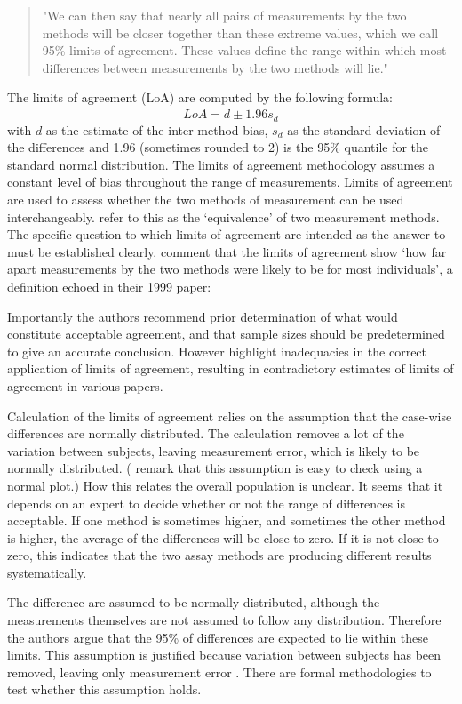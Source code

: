 \documentclass[12pt, a4paper]{report}
\theoremstyle{plain}
\theoremstyle{definition}
\theoremstyle{remark}
\begin{document}
\begin{quote}"We can then say that nearly all pairs
	of measurements by the two methods will be closer together than
	these extreme values, which we call 95\% limits of agreement.
	These values define the range within which most differences
	between measurements by the two methods will lie."
\end{quote}

	
	The limits of agreement (LoA) are computed by the following
	formula:
	\[
	LoA = \bar{d} \pm 1.96 s_{d}
	\]
	with $\bar{d}$ as the estimate of the inter method bias, $s_{d}$
	as the standard deviation of the differences and 1.96 (sometimes rounded to 2) is the 95\%
	quantile for the standard normal distribution. The limits of agreement methodology assumes a constant level of bias throughout the range of measurements.
Limits of agreement are used to assess whether the two methods of
measurement can be used interchangeably. \citet{BA86} refer to
this as the `equivalence' of two measurement methods. The specific question to which limits of agreement are intended as the answer to must be established clearly. \citet*{BA95} comment that the limits of agreement show `how	far apart measurements by the two methods were likely to be for most individuals', a definition echoed in their 1999 paper:



Importantly the authors recommend prior determination of what would constitute acceptable
agreement, and that sample sizes should be predetermined to give an accurate conclusion. However \citet{mantha} highlight inadequacies in the correct application of limits of agreement, resulting in contradictory estimates of limits of agreement in various papers.

Calculation of the limits of agreement relies on the assumption that the case-wise differences are normally distributed.
The calculation removes a lot of the variation between subjects,  leaving measurement error, which is likely to be normally distributed. (\citet{BA99} remark that this assumption is easy to check using a normal plot.) 
	How this relates the overall population is unclear. It seems that it depends on an expert to decide whether or not the range of
	differences is acceptable. 
	If one method is sometimes higher, and sometimes the other method is higher, the average of the differences will be close to zero.
	If it is not close to zero, this indicates that the two assay methods are producing different results systematically.
	
The difference are assumed to be normally distributed, although the measurements themselves are not assumed to follow any distribution. Therefore the authors argue that the 95\% of differences are expected to lie within these limits. This assumption is justified because variation between subjects has been removed, leaving only measurement error \citep{BA86}. There are formal methodologies to test whether this assumption holds.
\end{document}

